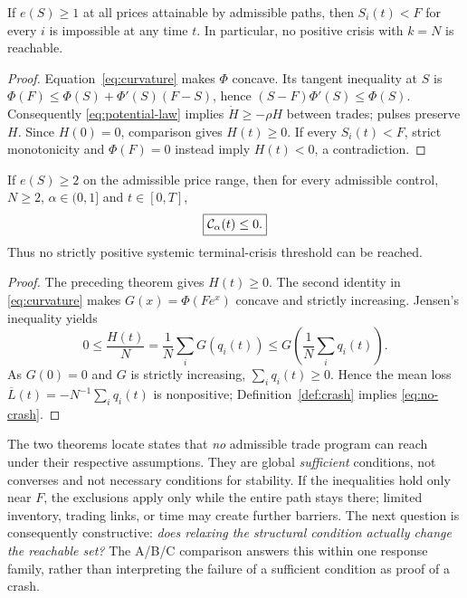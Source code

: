 \documentclass[review,hidelinks,onefignum,onetabnum]{siamonline250211}
\begin{document}
\begin{theorem}\label{thm:barrier1}
If $e(S)\ge1$ at all prices attainable by admissible paths, then $S_i(t)<F$ for every $i$ is impossible at any time $t$. In particular, no positive crisis with $k=N$ is reachable.
\end{theorem}
\begin{proof}
Equation~\eqref{eq:curvature} makes $\Phi$ concave. Its tangent inequality at $S$ is $\Phi(F)\le\Phi(S)+\Phi'(S)(F-S)$, hence $(S-F)\Phi'(S)\le\Phi(S)$. Consequently \eqref{eq:potential-law} implies $\dot H\ge-\rho H$ between trades; pulses preserve $H$. Since $H(0)=0$, comparison gives $H(t)\ge0$. If every $S_i(t)<F$, strict monotonicity and $\Phi(F)=0$ instead imply $H(t)<0$, a contradiction.
\end{proof}

\begin{theorem}\label{thm:barrier2}
If $e(S)\ge2$ on the admissible price range, then for every admissible control, $N\ge2$, $\alpha\in(0,1]$ and $t\in[0,T]$,
\begin{equation}\label{eq:no-crash}
\boxed{\mathcal{C}_\alpha(t)\le0.}
\end{equation}
Thus no strictly positive systemic terminal-crisis threshold can be reached.
\end{theorem}
\begin{proof}
The preceding theorem gives $H(t)\ge0$. The second identity in \eqref{eq:curvature} makes $G(x)=\Phi(Fe^x)$ concave and strictly increasing. Jensen's inequality yields
\[
0\le\frac{H(t)}N=\frac1N\sum_iG(q_i(t))
\le G\!\left(\frac1N\sum_iq_i(t)\right).
\]
As $G(0)=0$ and $G$ is strictly increasing, $\sum_iq_i(t)\ge0$. Hence the mean loss $\overline L(t)=-N^{-1}\sum_iq_i(t)$ is nonpositive; Definition~\ref{def:crash} implies \eqref{eq:no-crash}.
\end{proof}

The two theorems locate states that \emph{no} admissible trade program can reach under their respective assumptions. They are global \emph{sufficient} conditions, not converses and not necessary conditions for stability. If the inequalities hold only near $F$, the exclusions apply only while the entire path stays there; limited inventory, trading links, or time may create further barriers. The next question is consequently constructive: \emph{does relaxing the structural condition actually change the reachable set?} The A/B/C comparison answers this within one response family, rather than interpreting the failure of a sufficient condition as proof of a crash.
\end{document}
